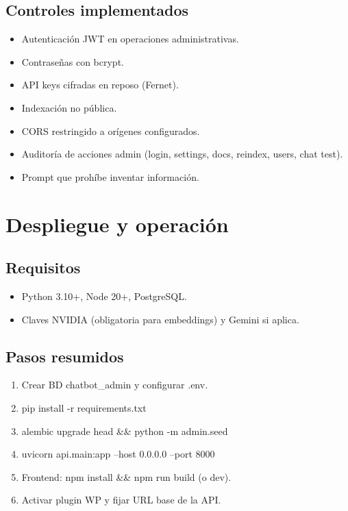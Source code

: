 \documentclass[11pt, a4paper, oneside]{report}
\begin{document}
\section{Controles implementados}
\begin{itemize}
  \item Autenticación JWT en operaciones administrativas.
  \item Contraseñas con bcrypt.
  \item API keys cifradas en reposo (Fernet).
  \item Indexación no pública.
  \item CORS restringido a orígenes configurados.
  \item Auditoría de acciones admin (login, settings, docs, reindex, users, chat test).
  \item Prompt que prohíbe inventar información.
\end{itemize}

\chapter{Despliegue y operación}

\section{Requisitos}
\begin{itemize}
  \item Python 3.10+, Node 20+, PostgreSQL.
  \item Claves NVIDIA (obligatoria para embeddings) y Gemini si aplica.
\end{itemize}

\section{Pasos resumidos}
\begin{enumerate}
  \item Crear BD {chatbot\_admin} y configurar {.env}.
  \item {pip install -r requirements.txt}
  \item {alembic upgrade head \&\& python -m admin.seed}
  \item {uvicorn api.main:app --host 0.0.0.0 --port 8000}
  \item Frontend: {npm install \&\& npm run build} (o {dev}).
  \item Activar plugin WP y fijar URL base de la API.
\end{enumerate}
\end{document}
